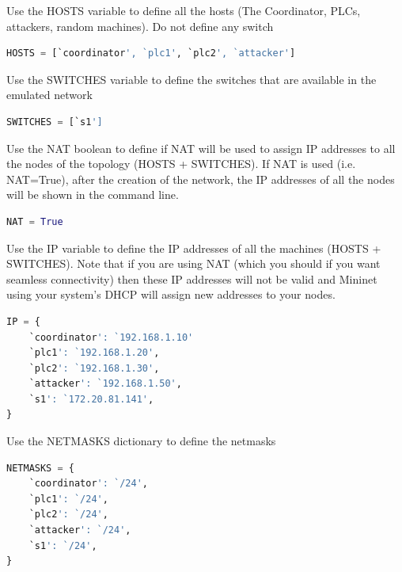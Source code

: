 \documentclass[book,a4paper,12pt]{memoir}
\begin{document}
\noindent Use the HOSTS variable to define all the hosts (The Coordinator, PLCs, attackers, random machines).  Do not define any switch

\begin{lstlisting}[backgroundcolor = \color{ultralightgray}, language = Python, xleftmargin = 0.1cm, framexleftmargin = 0.3em, showstringspaces=false]
HOSTS = [`coordinator', `plc1', `plc2', `attacker']
\end{lstlisting}


\noindent Use the SWITCHES variable to define the switches that are available in the emulated network

\begin{lstlisting}[backgroundcolor = \color{ultralightgray}, language = Python, xleftmargin = 0.1cm, framexleftmargin = 0.3em, showstringspaces=false]
SWITCHES = [`s1']
\end{lstlisting}

\noindent Use the NAT boolean to define if NAT will be used to assign IP addresses to all the nodes of the topology (HOSTS + SWITCHES).  If NAT is used (i.e. NAT=True), after the creation of the network, the IP addresses of all the nodes will be shown in the command line.
\begin{lstlisting}[backgroundcolor = \color{ultralightgray}, language = Python, xleftmargin = 0.1cm, framexleftmargin = 0.3em, showstringspaces=false]
NAT = True
\end{lstlisting}

\noindent Use the IP variable to define the IP addresses of all the machines (HOSTS + SWITCHES).  Note that if you are using NAT (which you should if you want seamless connectivity) then these IP addresses will not be valid and Mininet using your system's DHCP will assign new addresses to your nodes.

\begin{lstlisting}[backgroundcolor = \color{ultralightgray}, language = Python, xleftmargin = 0.1cm, framexleftmargin = 0.3em, showstringspaces=false]
IP = {
    `coordinator': `192.168.1.10'
    `plc1': `192.168.1.20',
    `plc2': `192.168.1.30',
    `attacker': `192.168.1.50',
    `s1': `172.20.81.141',
}
\end{lstlisting}


\noindent Use the NETMASKS dictionary to define the netmasks

\begin{lstlisting}[backgroundcolor = \color{ultralightgray}, language = Python, xleftmargin = 0.1cm, framexleftmargin = 0.3em, showstringspaces=false]
NETMASKS = {
    `coordinator': `/24',
    `plc1': `/24',
    `plc2': `/24',
    `attacker': `/24',
    `s1': `/24',
}
\end{lstlisting}
\end{document}
